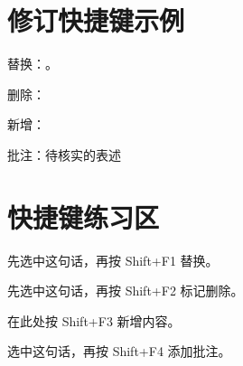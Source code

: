 \documentclass[twocolumn]{ctexart}
\begin{document}
\section*{修订快捷键示例}
替换：。

删除：

新增：

批注：待核实的表述

\section*{快捷键练习区}
先选中这句话，再按 Shift+F1 替换。

先选中这句话，再按 Shift+F2 标记删除。

在此处按 Shift+F3 新增内容。

选中这句话，再按 Shift+F4 添加批注。
\end{document}
